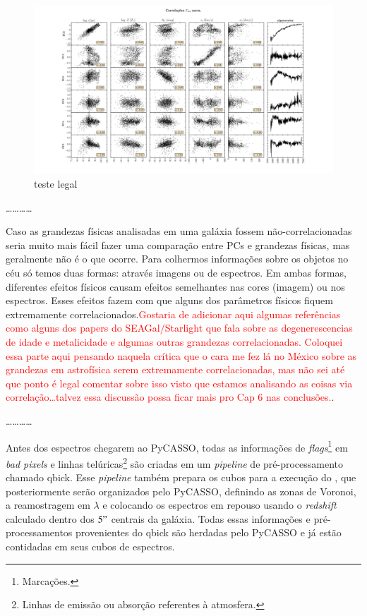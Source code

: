 \begin{figure}
    \includegraphics[width=1.5\textwidth, angle=-90]{figuras/correl-f_obs_norm-PCvsPhys2.pdf}
    \caption[um teste]
    {teste legal}
    \label{fig:UsoPCA:correlat}
\end{figure}

\ldots \dots \ldots \ldots

Caso as grandezas físicas analisadas em uma galáxia fossem não-correlacionadas seria muito mais fácil fazer uma
comparação entre PCs e grandezas físicas, mas geralmente não é o que ocorre. Para colhermos informações sobre os objetos
no céu só temos duas formas: através imagens ou de espectros. Em ambas formas, diferentes efeitos físicos causam efeitos
semelhantes nas cores (imagem) ou nos espectros. Esses efeitos fazem com que alguns dos parâmetros físicos fiquem
extremamente correlacionados.\ojo \citneed \textcolor{red}{Gostaria de adicionar aqui algumas referências como alguns
dos papers do SEAGal/Starlight que fala sobre as degenerescencias de idade e metalicidade e algumas outras grandezas
correlacionadas. Coloquei essa parte aqui pensando naquela crítica que o cara me fez lá no México sobre as grandezas em
astrofísica serem extremamente correlacionadas, mas não sei até que ponto é legal comentar sobre isso visto que
estamos analisando as coisas via correlação\ldots talvez essa discussão possa ficar mais pro Cap 6 nas conclusões.}.

\ldots \dots \ldots \ldots

Antes dos espectros chegarem ao PyCASSO, todas as informações de {\em flags}\footnote{Marcações.} em {\em bad pixels} e
linhas telúricas\footnote{Linhas de emissão ou absorção referentes à atmosfera.} são criadas em um {\em pipeline} de
pré-processamento chamado {\sc qbick}. Esse {\em pipeline} também prepara os cubos para a execução do \starlight, que
posteriormente serão organizados pelo PyCASSO, definindo as zonas de Voronoi, a reamostragem em $\lambda$ e colocando os
espectros em repouso usando o {\em redshift} calculado dentro dos $5"$ centrais da galáxia. Todas essas informações e
pré-processamentos provenientes do {\sc qbick} são herdadas pelo PyCASSO e já estão contidadas em seus cubos de
espectros.


